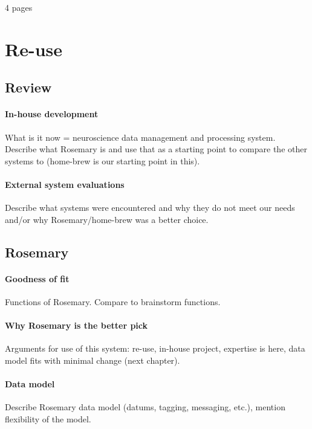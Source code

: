 \newline

4 pages

\section{Re-use}

\subsection{Review}
\paragraph{In-house development}
What is it now = neuroscience data management and processing system.
Describe what Rosemary is and use that as a starting point to compare the other systems to (home-brew is our starting point in this).
\paragraph{External system evaluations}
Describe what systems were encountered and why they do not meet our needs and/or why Rosemary/home-brew was a better choice.

\subsection{Rosemary}
\paragraph{Goodness of fit}
Functions of Rosemary.
Compare to brainstorm functions.
\paragraph{Why Rosemary is the better pick}
Arguments for use of this system: re-use, in-house project, expertise is here, data model fits with minimal change (next chapter).
\paragraph{Data model}
Describe Rosemary data model (datums, tagging, messaging, etc.), mention flexibility of the model.